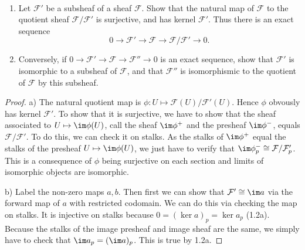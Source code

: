 \begin{exercise}%
	~
	\begin{enumerate}
		\item Let $\mathcal{F}' $ be a subsheaf of a sheaf $\mathcal{F} $. Show that the natural map of $\mathcal{F} $ to the quotient sheaf $\mathcal{F} / \mathcal{F}' $ is surjective, and has kernel $\mathcal{F}' $. Thus there is an exact sequence
		\[
			0 \to \mathcal{F}' \to \mathcal{F} \to \mathcal{F} / \mathcal{F}' \to 0
		.\] 
		\item Conversely, if $0 \to \mathcal{F}' \to \mathcal{F} \to \mathcal{F}''\to 0 $ is an exact sequence, show that $\mathcal{F}' $ is isomorphic to a subsheaf of $\mathcal{F} $, and that $\mathcal{F}'' $ is isomorphismic to the quotient of $\mathcal{F} $ by this subsheaf.
	\end{enumerate}
\end{exercise}
\begin{proof}
	a) 
	The natural quotient map is $\phi: U \mapsto \mathcal{F}(U) / \mathcal{F}'(U)$.
	Hence $\phi$ obvously has kernel $\mathcal{F}' $.
	To show that it is surjective, we have to show that the sheaf associated to $U\mapsto \im \phi(U) $, call the sheaf $\im \phi^+ $ and the presheaf $\im \phi^- $, equals $\mathcal{F} / \mathcal{F}' $.
	To do this, we can check it on stalks.
	As the stalks of $\im \phi^+ $ equal the stalks of the presheaf $U\mapsto \im \phi(U) $, we just have to verify that $\im \phi^-_p \cong \mathcal{F} / \mathcal{F}'_p$.
	This is a consequence of $\phi $ being surjective on each section and limits of isomorphic objects are isomorphic.

	b)
	Label the non-zero maps $a,b $.
	Then first we can show that $\mathcal{F}' \cong \im a $ via the forward map of $a $ with restricted codomain.
	We can do this via checking the map on stalks.
	It is injective on stalks because $0 = (\ker a)_p = \ker a_p$ (1.2a).
	Because the stalks of the image presheaf and image sheaf are the same, we simply have to check that $\im a_p = (\im a)_p $.
	This is true by 1.2a.
\end{proof}

